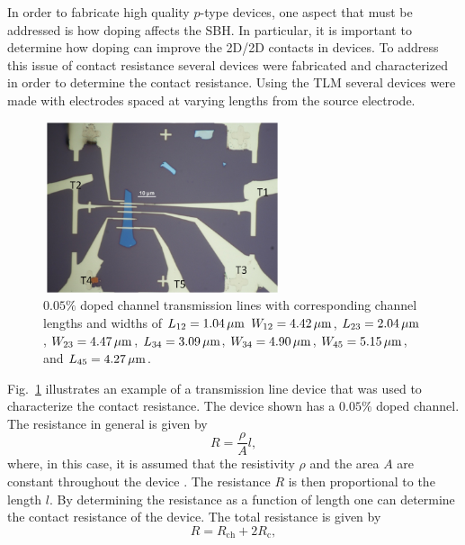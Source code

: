 \noindent In order to fabricate high quality $p$-type  devices, one aspect that must be addressed is how doping affects the \ac{SBH}. In particular, it is important to determine how doping can improve the 2D/2D contacts in devices. To address this issue of contact resistance several devices were fabricated and characterized in order to determine the contact resistance. Using the \ac{TLM} several  devices were made with electrodes spaced at varying lengths from the source electrode. 
\begin{figure}[ht]
	\centering
	\includegraphics[height=5cm,width=7cm]{figs/results/transmission_line/transmission_device_pic_5-5_21_10232015_no1}
	\caption[Transmission line $0.05\%$  doped  channel device]{$0.05\%$  doped  channel transmission lines with corresponding channel lengths and widths of $L_{12} = 1.04\,\mathrm{\mu m}$ $W_{12} = 4.42\,\mathrm{\mu m}$, $L_{23} = 2.04\,\mathrm{\mu m}$, $W_{23} = 4.47\,\mathrm{\mu m}$, $L_{34} = 3.09\,\mathrm{\mu m}$, $W_{34} = 4.90\,\mathrm{\mu m}$, $W_{45} = 5.15\,\mathrm{\mu m}$, and $L_{45} = 4.27\,\mathrm{\mu m}$.}
	\label{fig:transmission_device_10232015_no1}
\end{figure}
Fig.~\ref{fig:transmission_device_10232015_no1} illustrates an example of a transmission line device that was used to characterize the contact resistance. The device shown has a $0.05\%$  doped  channel. The resistance in general is given by
\begin{equation}\label{eq:resistance_formula}
	R = \frac{\rho}{A} l,
\end{equation}
where, in this case, it is assumed that the resistivity $\rho$ and the area $A$ are constant throughout the device \cite{Schroder_Semiconductor2006}. The resistance $R$ is then proportional to the length $l$. By determining the resistance as a function of length one can determine the contact resistance of the device. The total resistance is given by
\begin{equation}\label{eq:resistance_total}
	R = R_\mathrm{ch} + 2R_\mathrm{c},
\end{equation}
